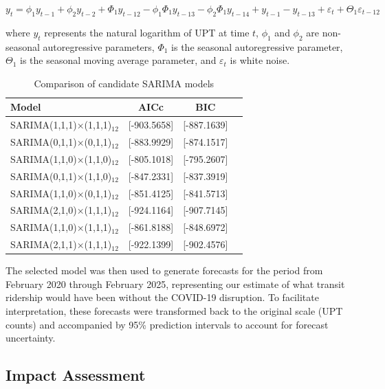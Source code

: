 \documentclass[11pt]{article}
\begin{document}
\begin{equation}
y_t = \phi_1 y_{t-1} + \phi_2 y_{t-2} + \Phi_1 y_{t-12} - \phi_1\Phi_1 y_{t-13} - \phi_2\Phi_1 y_{t-14} + y_{t-1} - y_{t-13} + \varepsilon_t + \Theta_1 \varepsilon_{t-12}
\end{equation}

where $y_t$ represents the natural logarithm of UPT at time $t$, $\phi_1$ and $\phi_2$ are non-seasonal autoregressive parameters, $\Phi_1$ is the seasonal autoregressive parameter, $\Theta_1$ is the seasonal moving average parameter, and $\varepsilon_t$ is white noise.

\begin{table}[!ht]
\caption{Comparison of candidate SARIMA models}
\label{t:model_comparison}
\begin{center}
\begin{tabular}{lccc}
\hline
Model & AICc & BIC\\
\hline
SARIMA(1,1,1)×(1,1,1)$_{12}$ & [-903.5658] & [-887.1639] \\
SARIMA(0,1,1)×(0,1,1)$_{12}$ & [-883.9929] & [-874.1517] \\
SARIMA(1,1,0)×(1,1,0)$_{12}$ & [-805.1018] & [-795.2607] \\
SARIMA(0,1,1)×(1,1,0)$_{12}$ & [-847.2331] & [-837.3919] \\
SARIMA(1,1,0)×(0,1,1)$_{12}$ & [-851.4125] & [-841.5713] \\
SARIMA(2,1,0)×(1,1,1)$_{12}$ & [-924.1164] & [-907.7145] \\
SARIMA(1,1,0)×(1,1,1)$_{12}$ & [-861.8188] & [-848.6972] \\
SARIMA(2,1,1)×(1,1,1)$_{12}$ & [-922.1399] & [-902.4576] \\
\hline
\end{tabular}
\end{center}
\end{table}

The selected model was then used to generate forecasts for the period from February 2020 through February 2025, representing our estimate of what transit ridership would have been without the COVID-19 disruption. To facilitate interpretation, these forecasts were transformed back to the original scale (UPT counts) and accompanied by 95\% prediction intervals to account for forecast uncertainty.

\subsection{Impact Assessment}
\end{document}
